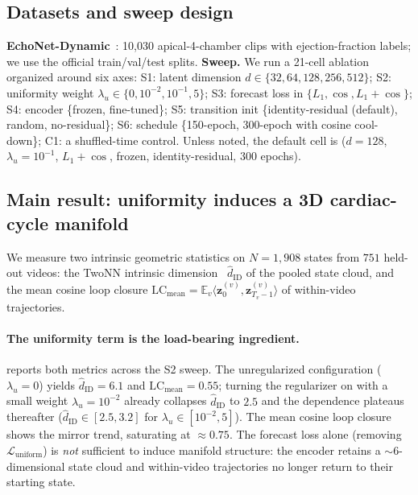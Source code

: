 \documentclass[runningheads]{llncs}
\begin{document}
\subsection{Datasets and sweep design}
\textbf{EchoNet-Dynamic}~\cite{echonet}: 10,030 apical-4-chamber clips with
ejection-fraction labels; we use the official train/val/test splits.
\textbf{Sweep.}
We run a 21-cell ablation organized around six axes:
S1: latent dimension $d\in\{32,64,128,256,512\}$;
S2: uniformity weight $\lambda_u\in\{0,10^{-2},10^{-1},5\}$;
S3: forecast loss in $\{L_1,\cos,L_1{+}\cos\}$;
S4: encoder \{frozen, fine-tuned\};
S5: transition init \{identity-residual (default), random, no-residual\};
S6: schedule \{150-epoch, 300-epoch with cosine cool-down\};
C1: a shuffled-time control. Unless noted, the default cell is
($d{=}128$, $\lambda_u{=}10^{-1}$, $L_1{+}\cos$, frozen, identity-residual,
$300$ epochs).

\subsection{Main result: uniformity induces a 3D cardiac-cycle manifold}
\label{sec:geometry}

We measure two intrinsic geometric statistics on $N{=}1{,}908$ states from
$751$ held-out videos: the TwoNN intrinsic
dimension~\cite{facco2017twonn} $\widehat{d}_\mathrm{ID}$ of the pooled
state cloud, and the mean cosine loop closure
$\mathrm{LC}_\mathrm{mean}\!=\!\mathbb{E}_v\langle\mathbf{z}_0^{(v)},\mathbf{z}_{T_v-1}^{(v)}\rangle$
of within-video trajectories.

\paragraph{The uniformity term is the load-bearing ingredient.}
 reports both metrics across the S2 sweep. The
unregularized configuration ($\lambda_u\!=\!0$) yields
$\widehat{d}_\mathrm{ID}\!=\!6.1$ and $\mathrm{LC}_\mathrm{mean}\!=\!0.55$;
turning the regularizer on with a small weight $\lambda_u{=}10^{-2}$
already collapses $\widehat{d}_\mathrm{ID}$ to $2.5$ and the dependence
plateaus thereafter ($\widehat{d}_\mathrm{ID}\!\in\![2.5, 3.2]$ for
$\lambda_u\!\in\![10^{-2}, 5]$). The mean cosine loop closure shows the
mirror trend, saturating at $\approx 0.75$. The forecast loss alone
(removing $\mathcal{L}_\mathrm{uniform}$) is \emph{not} sufficient to
induce manifold structure: the encoder retains a $\sim$6-dimensional
state cloud and within-video trajectories no longer return to their
starting state.
\end{document}
